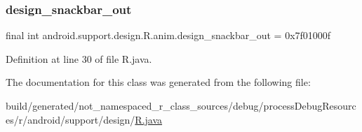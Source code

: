 \subsubsection{\texorpdfstring{design\_snackbar\_out}{design\_snackbar\_out}}
{\footnotesize\ttfamily final int android.\+support.\+design.\+R.\+anim.\+design\+\_\+snackbar\+\_\+out = 0x7f01000f\hspace{0.3cm}{\ttfamily [static]}}



Definition at line 30 of file R.\+java.



The documentation for this class was generated from the following file\+:\begin{DoxyCompactItemize}
\item 
build/generated/not\+\_\+namespaced\+\_\+r\+\_\+class\+\_\+sources/debug/process\+Debug\+Resources/r/android/support/design/\mbox{\hyperlink{android_2support_2design_2_r_8java}{R.\+java}}\end{DoxyCompactItemize}
